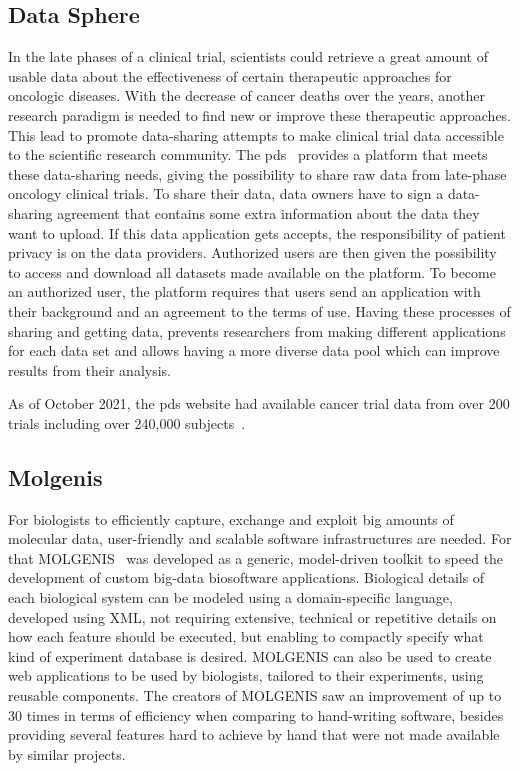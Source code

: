\subsection*{Data Sphere}
In the late phases of a clinical trial, scientists could retrieve a great amount of usable data about the effectiveness of certain therapeutic approaches for oncologic diseases.
With the decrease of cancer deaths over the years, another research paradigm is needed to find new or improve these therapeutic approaches.
This lead to promote data-sharing attempts to make clinical trial data accessible to the scientific research community.
The \gls{pds}~\cite{datasphere} provides a platform that meets these data-sharing needs, giving the possibility to share raw data from late-phase oncology clinical trials.
To share their data, data owners have to sign a data-sharing agreement that contains some extra information about the data they want to upload.
If this data application gets accepts, the responsibility of patient privacy is on the data providers.
Authorized users are then given the possibility to access and download all datasets made available on the platform.
To become an authorized user, the platform requires that users send an application with their background and an agreement to the terms of use.
Having these processes of sharing and getting data, prevents researchers from making different applications for each data set and allows having a more diverse data pool which can improve results from their analysis.

As of October 2021, the \gls{pds} website had available cancer trial data from over 200 trials including over 240,000 subjects~\cite{datasphere-site}.

\subsection*{Molgenis}
For biologists to efficiently capture, exchange and exploit big amounts of molecular data, user-friendly and scalable software infrastructures are needed.
For that MOLGENIS~\cite{molgenis} was developed as a generic, model-driven toolkit to speed the development of custom big-data biosoftware applications.
Biological details of each biological system can be modeled using a domain-specific language, developed using XML, not requiring extensive, technical or repetitive details on how each feature should be executed, but enabling to compactly specify what kind of experiment database is desired.
MOLGENIS can also be used to create web applications to be used by biologists, tailored to their experiments, using reusable components.
The creators of MOLGENIS saw an improvement of up to 30 times in terms of efficiency when comparing to hand-writing software, besides providing several features hard to achieve by hand that were not made available by similar projects.

